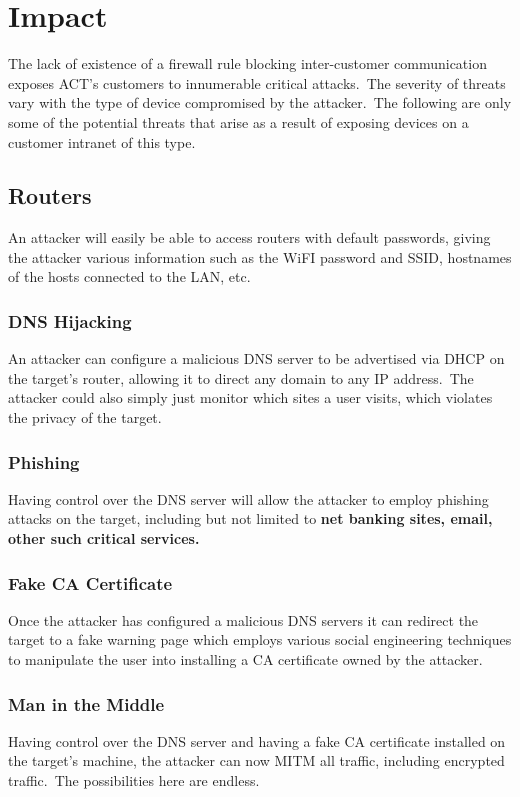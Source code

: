 \documentclass[11pt]{article}
\begin{document}
    \section{Impact}\label{sec:impact}
    The lack of existence of a firewall rule blocking inter-customer communication exposes ACT's customers to
    innumerable critical attacks.\ The severity of threats vary with the type of device compromised by the attacker.\
    The following are only some of the potential threats that arise as a result of exposing devices on a customer
    intranet of this type.

    \subsection{Routers}\label{subsec:routers}
    An attacker will easily be able to access routers with default passwords, giving the attacker various information
    such as the WiFI password and SSID, hostnames of the hosts connected to the LAN, etc.\

    \subsubsection{DNS Hijacking}
    An attacker can configure a malicious DNS server to be advertised via DHCP on the target's router, allowing it to
    direct any domain to any IP address.\ The attacker could also simply just monitor which sites a user visits,
    which violates the privacy of the target.

    \subsubsection{Phishing}
    Having control over the DNS server will allow the attacker to employ phishing attacks on the target, including
    but not limited to \textbf{net banking sites, email, other such critical services.}

    \subsubsection{Fake CA Certificate}
    Once the attacker has configured a malicious DNS servers it can redirect the target to a fake warning page which
    employs various social engineering techniques to manipulate the user into installing a CA certificate owned by the
    attacker.

    \subsubsection{Man in the Middle}
    Having control over the DNS server and having a fake CA certificate installed on the target's machine, the
    attacker can now MITM all traffic, including encrypted traffic.\ The possibilities here are endless.
\end{document}
